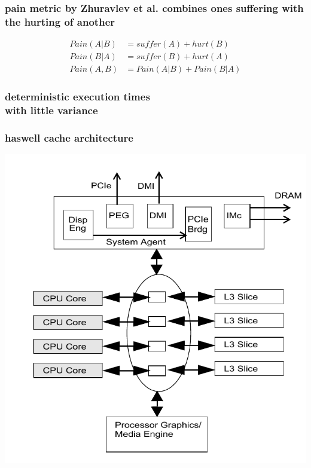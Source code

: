 \documentclass[utf8,10pt]{beamer}
\begin{document}
\begin{frame}
  \frametitle{pain metric by Zhuravlev et al. combines ones suffering with the
  hurting of another}
  \centering
  \begin{align*}
    Pain(A|B) &= suffer(A) + hurt(B) \\
    Pain(B|A) &= suffer(B) + hurt(A) \\
    Pain(A,B) &= Pain(A|B) + Pain(B|A)
  \end{align*}
\end{frame}

\begin{frame}
  \frametitle{deterministic execution times \\ with little variance}

\end{frame}


\begin{frame}
  \frametitle{haswell cache architecture}
  \centering
  \begin{minipage}[l]{.49\columnwidth}
    
  \end{minipage}
  \begin{minipage}[r]{.49\columnwidth}
    \includegraphics[scale=.27]{../haswell_architecture_by_intel_large_cropped}
  \end{minipage}
\end{frame}
\end{document}
